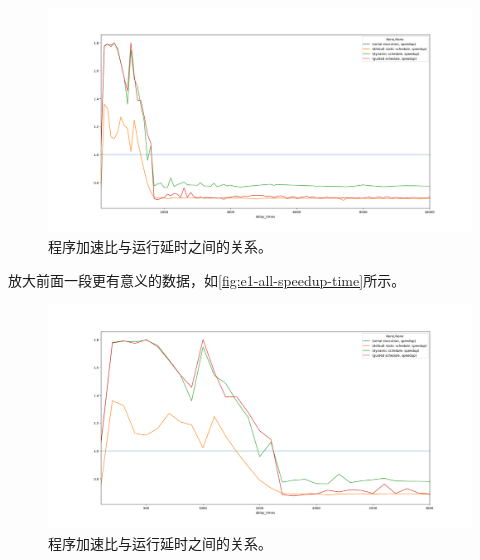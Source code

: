 \documentclass[forprint]{myreport}
\begin{document}
\begin{figure}[htp]
    \centering
    \includegraphics[width=15cm]{"../HW3-1/figure/all_to10000.png"}
    \caption{程序加速比与运行延时之间的关系。}
    \label{fig:e1-all-speedup-time-full}
\end{figure}

放大前面一段更有意义的数据，如\autoref{fig:e1-all-speedup-time}所示。

\begin{figure}[htp]
    \centering
    \includegraphics[width=15cm]{"../HW3-1/figure/all_2.png"}
    \caption{程序加速比与运行延时之间的关系。}
    \label{fig:e1-all-speedup-time}
\end{figure}
\end{document}
